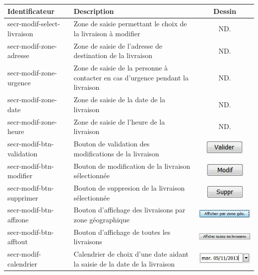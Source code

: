 \documentclass{report}
\begin{document}
\begin{longtable}{|p{5cm}|p{5cm}|c|}
\hline
Identificateur&Description&Dessin\\\hline
secr-modif-select-livraison&Zone de saisie permettant le choix de la livraison à modifier&ND.\\\hline
secr-modif-zone-adresse&Zone de saisie de l'adresse de destination de la livraison&ND.\\\hline
secr-modif-zone-urgence&Zone de saisie de la personne à contacter en cas d'urgence pendant la livraison&ND.\\\hline
secr-modif-zone-date&Zone de saisie de la date de la livraison&ND.\\\hline
secr-modif-zone-heure&Zone de saisie de l'heure de la livraison&ND.\\\hline
secr-modif-btn-validation&Bouton de validation des modifications de la livraison&\includegraphics{images/btn-sec-valid.jpg}\\\hline
secr-modif-btn-modifier&Bouton de modification de la livraison sélectionnée&\includegraphics{images/btn-sec-modif.jpg}\\\hline	
secr-modif-btn-supprimer&Bouton de suppresion de la livraison sélectionnée&\includegraphics{images/btn-sec-suppr.jpg}\\\hline	
secr-modif-btn-affzone&Bouton d'affichage des livraisons par zone géographique&\includegraphics{images/btn-sec-zone.jpg}\\\hline	
secr-modif-btn-afftout&Bouton d'affichage de toutes les livraisons&\includegraphics{images/btn-sec-afftout.jpg}\\\hline	
secr-modif-calendrier&Calendrier de choix d'une date aidant la saisie de la date de la livraison&\includegraphics{images/cal-sec-modif.jpg}\\\hline

\end{longtable}
\end{document}
